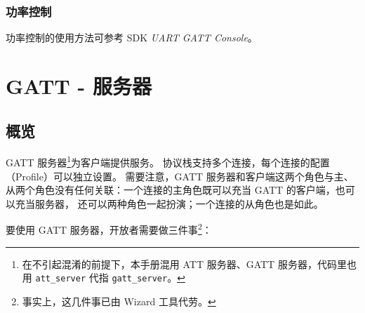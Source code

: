 \documentclass[
  12pt,
]{book}
\begin{document}
\hypertarget{ux529fux7387ux63a7ux5236}{%
\subsection{功率控制}\label{ux529fux7387ux63a7ux5236}}

功率控制的使用方法可参考 SDK \emph{UART GATT Console}。

\hypertarget{ch-gatt-server}{%
\chapter{GATT - 服务器}\label{ch-gatt-server}}

\hypertarget{ux6982ux89c8-3}{%
\section{概览}\label{ux6982ux89c8-3}}

GATT 服务器\footnote{在不引起混淆的前提下，本手册混用 ATT 服务器、GATT 服务器，代码里也用 \texttt{att\_server} 代指 \texttt{gatt\_server}。}为客户端提供服务。
协议栈支持多个连接，每个连接的配置（Profile）可以独立设置。
需要注意，GATT 服务器和客户端这两个角色与主、从两个角色没有任何关联：一个连接的主角色既可以充当 GATT 的客户端，也可以充当服务器，
还可以两种角色一起扮演；一个连接的从角色也是如此。

要使用 GATT 服务器，开放者需要做三件事\footnote{事实上，这几件事已由 Wizard 工具代劳。}：
\end{document}

